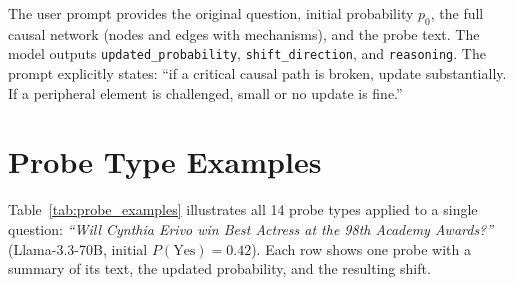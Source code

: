 \documentclass[11pt]{article}
\begin{document}
The user prompt provides the original question, initial probability $p_0$, the full causal network (nodes and edges with mechanisms), and the probe text. The model outputs \texttt{updated\_probability}, \texttt{shift\_direction}, and \texttt{reasoning}. The prompt explicitly states: ``if a critical causal path is broken, update substantially. If a peripheral element is challenged, small or no update is fine.''

\section{Probe Type Examples}
\label{app:probe-examples}

Table~\ref{tab:probe_examples} illustrates all 14 probe types applied to a single question: \emph{``Will Cynthia Erivo win Best Actress at the 98th Academy Awards?''} (Llama-3.3-70B, initial $P(\text{Yes}) = 0.42$). Each row shows one probe with a summary of its text, the updated probability, and the resulting shift.
\end{document}
